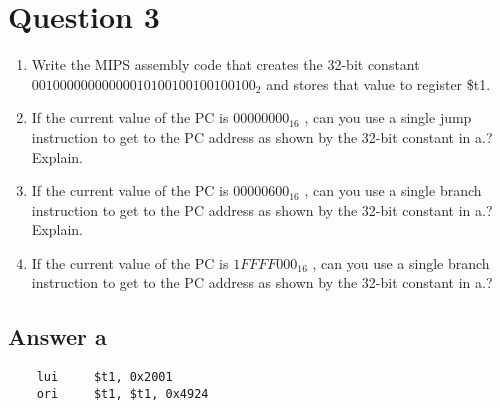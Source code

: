 \documentclass{article}
\begin{document}
\section{Question 3}
\begin{enumerate}
    \item Write the MIPS assembly code that creates the 32-bit constant
$0010 0000 0000 0001 0100 1001 0010 0100_2$
and stores that value to register \$t1.
    \item If the current value of the PC is $00000000_{16}$ , can you use a single jump instruction to get
to the PC address as shown by the 32-bit constant in a.? Explain.
    \item If the current value of the PC is $00000600_{16}$ , can you use a single branch instruction to
get to the PC address as shown by the 32-bit constant in a.? Explain.
    \item If the current value of the PC is $1FFFF000_{16}$ , can you use a single branch instruction to
get to the PC address as shown by the 32-bit constant in a.?
\end{enumerate}

\subsection{Answer a}
\begin{verbatim}
    lui     $t1, 0x2001
    ori     $t1, $t1, 0x4924

\end{verbatim}
\end{document}
